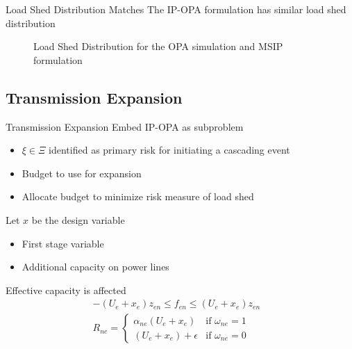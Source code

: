 \begin{frame}{Load Shed Distribution Matches}
The IP-OPA formulation has similar load shed distribution

\begin{figure}
 \centering
  \caption{Load Shed Distribution for the OPA simulation and MSIP formulation}
 \label{dist}
\end{figure}

\end{frame}



\subsection{Transmission Expansion}
\begin{frame}{Transmission Expansion}
Embed IP-OPA as subproblem
\pause
\begin{itemize}
\item $\xi \in \Xi$ identified as primary risk for initiating a cascading event
\item Budget to use for expansion
\item Allocate budget to minimize risk measure of load shed
\end{itemize}
\pause
Let $x$ be the design variable
\begin{itemize}
\item First stage variable
\item Additional capacity on power lines
\end{itemize}
\pause
Effective capacity is affected
\begin{align*}
-(U_{e}+x_e) z_{en} \le f_{en} \le (U_{e}+x_e) z_{en} &		\\
 R_{ne} = 
 \left\{ 
	\begin{array}{lr}
				\alpha_{ne} (U_e + x_e) & \mbox{if } \omega_{ne}=1\\
			  (U_e + x_e) + \epsilon & \mbox{if } \omega_{ne}=0
	\end{array}
 \right. 
\end{align*}
\end{frame}


